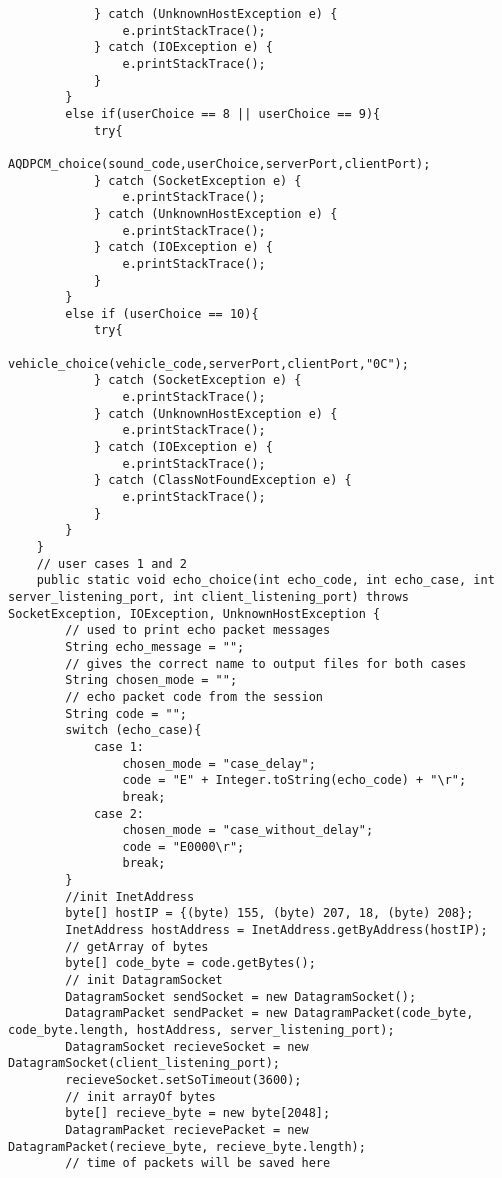 \documentclass{article}
\begin{document}
\begin{lstlisting}
            } catch (UnknownHostException e) {
                e.printStackTrace();
            } catch (IOException e) {
                e.printStackTrace();
            }
        }
        else if(userChoice == 8 || userChoice == 9){
            try{
                AQDPCM_choice(sound_code,userChoice,serverPort,clientPort);
            } catch (SocketException e) {
                e.printStackTrace();
            } catch (UnknownHostException e) {
                e.printStackTrace();
            } catch (IOException e) {
                e.printStackTrace();
            }
        }
        else if (userChoice == 10){
            try{
                vehicle_choice(vehicle_code,serverPort,clientPort,"0C");
            } catch (SocketException e) {
                e.printStackTrace();
            } catch (UnknownHostException e) {
                e.printStackTrace();
            } catch (IOException e) {
                e.printStackTrace();
            } catch (ClassNotFoundException e) {
                e.printStackTrace();
            }
        }
    }
    // user cases 1 and 2
    public static void echo_choice(int echo_code, int echo_case, int server_listening_port, int client_listening_port) throws SocketException, IOException, UnknownHostException {
        // used to print echo packet messages
        String echo_message = "";
        // gives the correct name to output files for both cases
        String chosen_mode = "";
        // echo packet code from the session
        String code = "";
        switch (echo_case){
            case 1:
                chosen_mode = "case_delay";
                code = "E" + Integer.toString(echo_code) + "\r";
                break;
            case 2:
                chosen_mode = "case_without_delay";
                code = "E0000\r";
                break;
        }
        //init InetAddress
        byte[] hostIP = {(byte) 155, (byte) 207, 18, (byte) 208};
        InetAddress hostAddress = InetAddress.getByAddress(hostIP);
        // getArray of bytes
        byte[] code_byte = code.getBytes();
        // init DatagramSocket
        DatagramSocket sendSocket = new DatagramSocket();
        DatagramPacket sendPacket = new DatagramPacket(code_byte, code_byte.length, hostAddress, server_listening_port);
        DatagramSocket recieveSocket = new DatagramSocket(client_listening_port);
        recieveSocket.setSoTimeout(3600);
        // init arrayOf bytes
        byte[] recieve_byte = new byte[2048];
        DatagramPacket recievePacket = new DatagramPacket(recieve_byte, recieve_byte.length);
        // time of packets will be saved here

\end{lstlisting}
\end{document}
